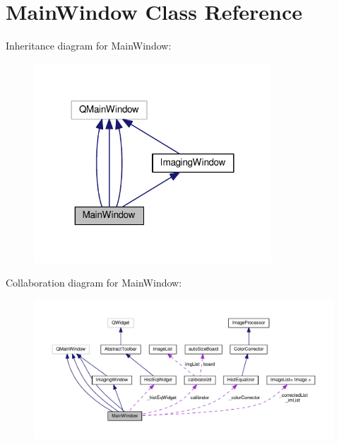 \hypertarget{classMainWindow}{}\section{Main\+Window Class Reference}
\label{classMainWindow}


Inheritance diagram for Main\+Window\+:\nopagebreak
\begin{figure}[H]
\begin{center}
\leavevmode
\includegraphics[width=252pt]{classMainWindow__inherit__graph}
\end{center}
\end{figure}


Collaboration diagram for Main\+Window\+:\nopagebreak
\begin{figure}[H]
\begin{center}
\leavevmode
\includegraphics[width=350pt]{classMainWindow__coll__graph}
\end{center}
\end{figure}
